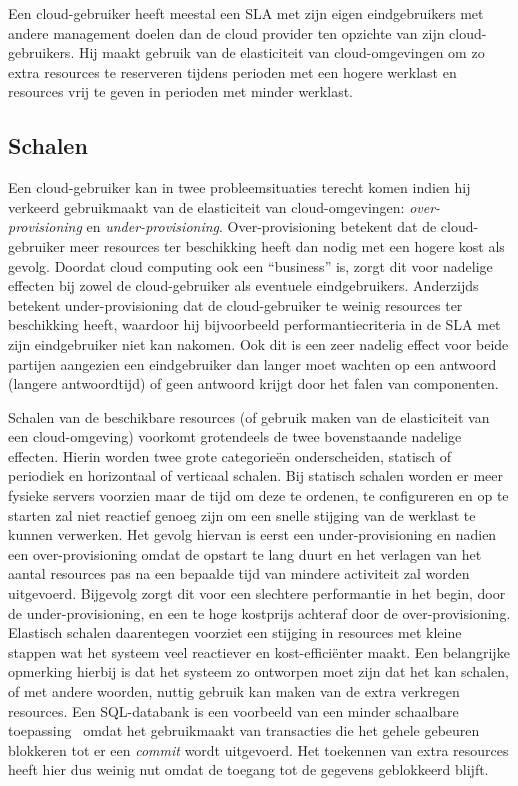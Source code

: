 Een cloud-gebruiker heeft meestal een SLA met zijn eigen eindgebruikers met andere management doelen dan de cloud provider ten opzichte van zijn cloud-gebruikers. Hij maakt gebruik van de elasticiteit van cloud-omgevingen om zo extra resources te reserveren tijdens perioden met een hogere werklast en resources vrij te geven in perioden met minder werklast.

\subsection{Schalen}

Een cloud-gebruiker kan in twee probleemsituaties terecht komen indien hij verkeerd gebruikmaakt van de elasticiteit van cloud-omgevingen: \textit{over-provisioning} en \textit{under-provisioning}. Over-provisioning betekent dat de cloud-gebruiker meer resources ter beschikking heeft dan nodig met een hogere kost als gevolg. Doordat cloud computing ook een ``business'' is, zorgt dit voor nadelige effecten bij  zowel de cloud-gebruiker als eventuele eindgebruikers. Anderzijds betekent under-provisioning dat de cloud-gebruiker te weinig resources ter beschikking heeft, waardoor hij bijvoorbeeld performantiecriteria in de SLA met zijn eindgebruiker niet kan nakomen. Ook dit is een zeer nadelig effect voor beide partijen aangezien een eindgebruiker dan langer moet wachten op een antwoord (langere antwoordtijd) of geen antwoord krijgt door het falen van componenten.

Schalen van de beschikbare resources (of gebruik maken van de elasticiteit van een cloud-omgeving) voorkomt grotendeels de twee bovenstaande nadelige effecten. Hierin worden twee grote categorieën onderscheiden, statisch of periodiek en horizontaal of verticaal schalen. Bij statisch schalen worden er meer fysieke servers voorzien maar de tijd om deze te ordenen, te configureren en op te starten zal niet reactief genoeg zijn om een snelle stijging van de werklast te kunnen verwerken. Het gevolg hiervan is eerst een under-provisioning en nadien een over-provisioning omdat de opstart te lang duurt en het verlagen van het aantal resources pas na een bepaalde tijd van mindere activiteit zal worden uitgevoerd. Bijgevolg zorgt dit voor een slechtere performantie in het begin, door de under-provisioning, en een te hoge kostprijs achteraf door de over-provisioning.
Elastisch schalen daarentegen voorziet een stijging in resources met kleine stappen wat het systeem veel reactiever en kost-efficiënter maakt. Een belangrijke opmerking hierbij is dat het systeem zo ontworpen moet zijn dat het kan schalen, of met andere woorden, nuttig gebruik kan maken van de extra verkregen resources. Een SQL-databank is een voorbeeld van een minder schaalbare toepassing~\cite{Vaquero2011} omdat het gebruikmaakt van transacties die het gehele gebeuren blokkeren tot er een \textit{commit} wordt uitgevoerd. Het toekennen van extra resources heeft hier dus weinig nut omdat de toegang tot de gegevens geblokkeerd blijft.

